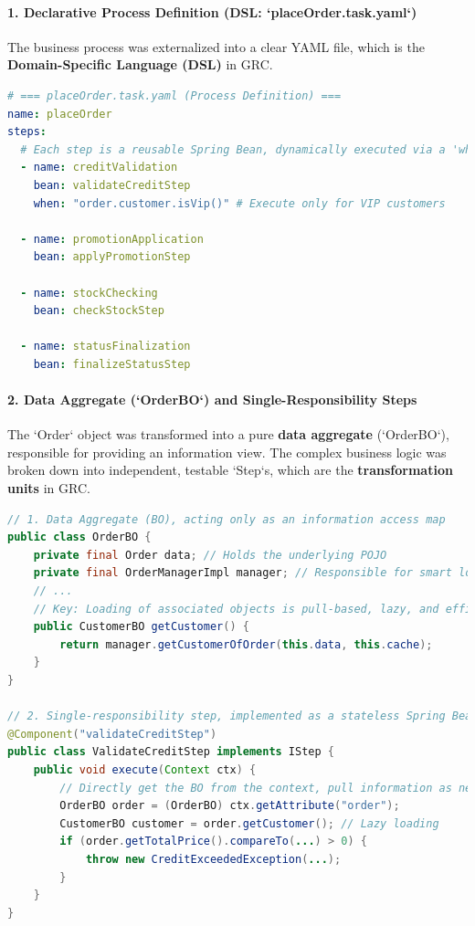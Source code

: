 \documentclass[11pt]{article}
\begin{document}
\paragraph{1. Declarative Process Definition (DSL: `placeOrder.task.yaml`)}
The business process was externalized into a clear YAML file, which is the \textbf{Domain-Specific Language (DSL)} in GRC.
\begin{lstlisting}[language=YAML,caption={Declarative Process Definition(placeOrder.task.yaml)}]
# === placeOrder.task.yaml (Process Definition) ===
name: placeOrder
steps:
  # Each step is a reusable Spring Bean, dynamically executed via a 'when' condition
  - name: creditValidation
    bean: validateCreditStep
    when: "order.customer.isVip()" # Execute only for VIP customers

  - name: promotionApplication
    bean: applyPromotionStep

  - name: stockChecking
    bean: checkStockStep

  - name: statusFinalization
    bean: finalizeStatusStep
\end{lstlisting}

\paragraph{2. Data Aggregate (`OrderBO`) and Single-Responsibility Steps}
The `Order` object was transformed into a pure \textbf{data aggregate} (`OrderBO`), responsible for providing an information view. The complex business logic was broken down into independent, testable `Step`s, which are the \textbf{transformation units} in GRC.

\begin{lstlisting}[language=Java, caption={Refactored Data Aggregate and Step}]
// 1. Data Aggregate (BO), acting only as an information access map
public class OrderBO {
    private final Order data; // Holds the underlying POJO
    private final OrderManagerImpl manager; // Responsible for smart loading
    // ...
    // Key: Loading of associated objects is pull-based, lazy, and efficient
    public CustomerBO getCustomer() {
        return manager.getCustomerOfOrder(this.data, this.cache);
    }
}

// 2. Single-responsibility step, implemented as a stateless Spring Bean
@Component("validateCreditStep")
public class ValidateCreditStep implements IStep {
    public void execute(Context ctx) {
        // Directly get the BO from the context, pull information as needed
        OrderBO order = (OrderBO) ctx.getAttribute("order");
        CustomerBO customer = order.getCustomer(); // Lazy loading
        if (order.getTotalPrice().compareTo(...) > 0) {
            throw new CreditExceededException(...);
        }
    }
}
\end{lstlisting}
\end{document}
